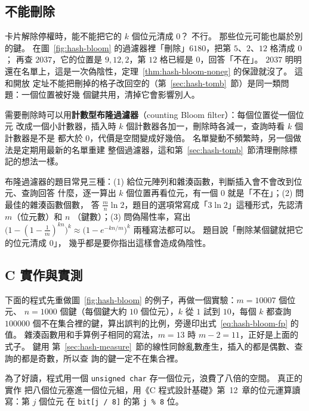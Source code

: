 \subsection{不能刪除}

卡片解除停權時，能不能把它的 $k$ 個位元清成 $0$？ 不行。 那些位元可能也屬於別的鍵。
在圖~\ref{fig:hash-bloom} 的過濾器裡「刪除」$6180$，把第 $5$、$2$、$12$ 格清成 $0$；
再查 $2037$，它的位置是 $9, 12, 2$，第 $12$ 格已經是 $0$，回答「不在」。 $2037$ 明明
還在名單上，這是一次偽陰性，定理~\ref{thm:hash-bloom-noneg} 的保證就沒了。 這和開放
定址不能把刪掉的格子改回空的（第~\ref{sec:hash-tomb}~節）是同一類問題：一個位置被好幾
個鍵共用，清掉它會影響別人。

需要刪除時可以用\textbf{計數型布隆過濾器}（counting Bloom filter）：每個位置從一個位元
改成一個小計數器，插入時 $k$ 個計數器各加一，刪除時各減一，查詢時看 $k$ 個計數器是不是
都大於 $0$，代價是空間變成好幾倍。 名單變動不頻繁時，另一個做法是定期用最新的名單重建
整個過濾器，這和第~\ref{sec:hash-tomb}~節清理刪除標記的想法一樣。

\begin{examnote}
布隆過濾器的題目常見三種：(1) 給位元陣列和雜湊函數，判斷插入會不會改到位元、查詢回答
什麼，逐一算出 $k$ 個位置再看位元，有一個 $0$ 就是「不在」；(2) 問最佳的雜湊函數個數，
答 $\frac{m}{n}\ln 2$，題目的選項常寫成「$3\ln 2$」這種形式，先認清 $m$（位元數）和 $n$
（鍵數）；(3) 問偽陽性率，寫出 $\bigl(1 - (1 - \frac1m)^{kn}\bigr)^k \approx
\bigl(1 - e^{-kn/m}\bigr)^k$ 兩種寫法都可以。 題目說「刪除某個鍵就把它的位元清成 $0$」，
幾乎都是要你指出這樣會造成偽陰性。
\end{examnote}

\subsection{C 實作與實測}
\label{sec:hash-bloom-c}

下面的程式先重做圖~\ref{fig:hash-bloom} 的例子，再做一個實驗：$m = 10007$ 個位元、
$n = 1000$ 個鍵（每個鍵大約 $10$ 個位元），$k$ 從 $1$ 試到 $10$，每個 $k$ 都查詢
$100000$ 個不在集合裡的鍵，算出誤判的比例，旁邊印出式~\eqref{eq:hash-bloom-fp} 的值。
雜湊函數用和手算例子相同的寫法，$m = 13$ 時 $m - 2 = 11$，正好是上面的式子。 鍵用
第~\ref{sec:hash-measure}~節的線性同餘亂數產生，插入的都是偶數、查詢的都是奇數，所以查
詢的鍵一定不在集合裡。

為了好讀，程式用一個 \texttt{unsigned char} 存一個位元，浪費了八倍的空間。 真正的實作
把八個位元塞進一個位元組，用《C 程式設計基礎》第~12~章的位元運算讀寫：第 $j$ 個位元
在 \texttt{bit[j / 8]} 的第 \texttt{j \% 8} 位。

